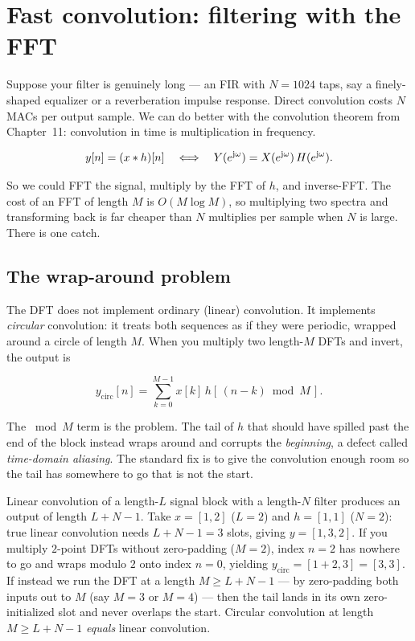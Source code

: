 \section{Fast convolution: filtering with the FFT}
\label{ch17:fastconv}

Suppose your filter is genuinely long --- an FIR with $N = 1024$ taps, say a
finely-shaped equalizer or a reverberation impulse response. Direct convolution
costs $N$ MACs per output sample. We can do better with the
convolution theorem from Chapter~11: convolution in time is multiplication in
frequency.

\begin{equation}
  y[n] = (x \ast h)[n]
  \quad\Longleftrightarrow\quad
  Y(e^{\mathrm{j}\omega}) = X(e^{\mathrm{j}\omega})\,H(e^{\mathrm{j}\omega}).
  \label{ch17:convthm}
\end{equation}

So we could FFT the signal, multiply by the FFT of $h$, and inverse-FFT. The cost
of an FFT of length $M$ is $O(M\log M)$, so multiplying two spectra and
transforming back is far cheaper than $N$ multiplies per sample when $N$ is
large. There is one catch.

\subsection{The wrap-around problem}

The DFT does not implement ordinary (linear) convolution. It implements
\emph{circular} convolution: it treats both sequences as if they were periodic,
wrapped around a circle of length $M$. When you multiply two length-$M$ DFTs and
invert, the output is

\begin{equation}
  y_{\text{circ}}[n] = \sum_{k=0}^{M-1} x[k]\, h[\,(n-k)\bmod M\,].
  \label{ch17:circ}
\end{equation}

The $\bmod M$ term is the problem. The tail of $h$ that should have spilled past the
end of the block instead wraps around and corrupts the \emph{beginning}, a defect
called \emph{time-domain aliasing}. The standard fix is to give the convolution
enough room so the tail has somewhere to go that is not the start.

\begin{whybox}
Linear convolution of a length-$L$ signal block with a length-$N$ filter
produces an output of length $L + N - 1$. Take $x = [1, 2]$ ($L=2$) and $h = [1, 1]$ ($N=2$): true linear convolution needs $L+N-1=3$ slots, giving $y = [1, 3, 2]$. If you multiply $2$-point DFTs without zero-padding ($M=2$), index $n=2$ has nowhere to go and wraps modulo $2$ onto index $n=0$, yielding $y_{\text{circ}} = [1+2, 3] = [3, 3]$. If instead we run the DFT at a length
$M \ge L + N - 1$ --- by zero-padding both inputs out to $M$ (say $M=3$ or $M=4$) --- then the
tail lands in its own zero-initialized slot and never
overlaps the start. Circular convolution at length $M \ge L+N-1$
\emph{equals} linear convolution.
\end{whybox}

